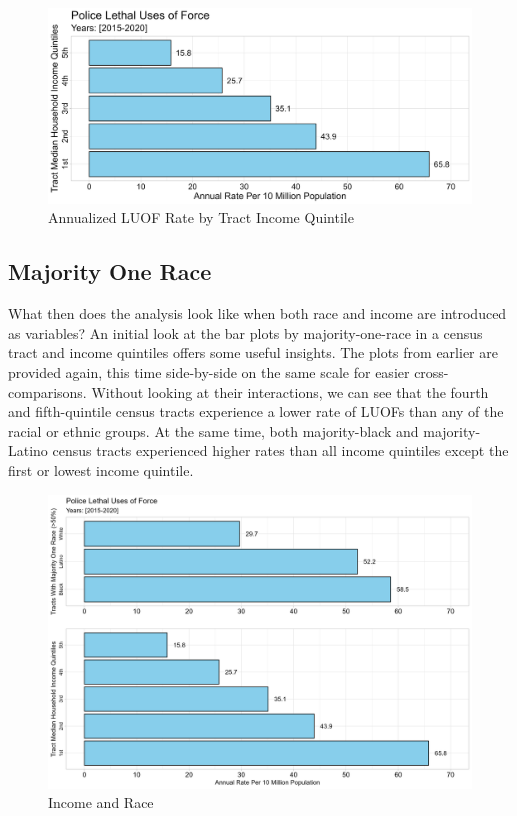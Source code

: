 \documentclass[12pt]{article}
\begin{document}
\begin{figure}[H]
  \centering %
  \includegraphics[width=\linewidth]{images/income_quintiles_only_ind}
  \captionsetup{justification=centering, singlelinecheck=false, margin=2cm}
  \caption[Annualized LUOF Rate by Tract Income Quintile]{Annualized LUOF Rate by Tract Income Quintile}
  \label{fig:income_quintile}
\end{figure}

\subsection{Majority One Race}

What then does the analysis look like when both race and income are introduced as variables? An initial look at the bar plots by majority-one-race in a census tract and income quintiles offers some useful insights. The plots from earlier are provided again, this time side-by-side on the same scale for easier cross-comparisons. Without looking at their interactions, we can see that the fourth and fifth-quintile census tracts experience a lower rate of LUOFs than any of the racial or ethnic groups. At the same time, both majority-black and majority-Latino census tracts experienced higher rates than all income quintiles except the first or lowest income quintile.

\begin{figure}[H]
  \centering %
  \includegraphics[width=\linewidth]{images/combined}
  \captionsetup{justification=centering, singlelinecheck=false, margin=2cm}
  \caption[Income and Race]{Income and Race}
  \label{fig:combined}
\end{figure}
\end{document}
